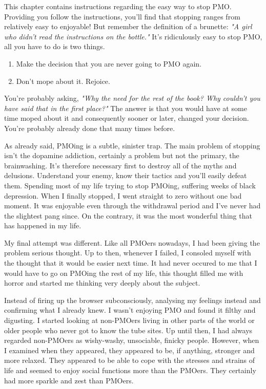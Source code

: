 \documentclass[easypeasy]{subfiles}
\begin{document}
This chapter contains instructions regarding the easy way to stop PMO. Providing you follow the instructions, you'll find that stopping ranges from relatively easy to enjoyable! But remember the definition of a brunette: \textit{"A girl who didn't read the instructions on the bottle."} It's ridiculously easy to stop PMO, all you have to do is two things.

\begin{enumerate}
  \item Make the decision that you are never going to PMO again.
  \item Don't mope about it. Rejoice.
\end{enumerate}

You're probably asking, \textit{"Why the need for the rest of the book? Why couldn't you have said that in the first place?"} The answer is that you would have at some time moped about it and consequently sooner or later, changed your decision. You're probably already done that many times before.

As already said, PMOing is a subtle, sinister trap. The main problem of stopping isn't the dopamine addiction, certainly a problem but not the primary, the brainwashing. It's therefore necessary first to destroy all of the myths and delusions. Understand your enemy, know their tactics and you'll easily defeat them. Spending most of my life trying to stop PMOing, suffering weeks of black depression. When I finally stopped, I went straight to zero without one bad moment. It was enjoyable even through the withdrawal period and I've never had the slightest pang since. On the contrary, it was the most wonderful thing that has happened in my life.

My final attempt was different. Like all PMOers nowadays, I had been giving the problem serious thought. Up to then, whenever I failed, I consoled myself with the thought that it would be easier next time. It had never occured to me that I would have to go on PMOing the rest of my life, this thought filled me with horror and started me thinking very deeply about the subject.

Instead of firing up the browser subconsciously, analysing my feelings instead and confirming what I already knew. I wasn't enjoying PMO and found it filthy and digusting. I started looking at non-PMOers living in other parts of the world or older people who never got to know the tube sites. Up until then, I had always regarded non-PMOers as wishy-washy, unsociable, finicky people. However, when I examined when they appeared, they appeared to be, if anything, stronger and more relaxed. They appeared to be able to cope with the stresses and strains of life and seemed to enjoy social functions more than the PMOers. They certainly had more sparkle and zest than PMOers.
\end{document}
